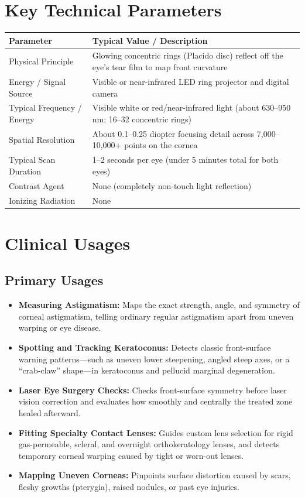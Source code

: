 \section{Key Technical Parameters}
\noindent
\begin{tabularx}{\textwidth}{@{}l X@{}}
\toprule
\textbf{Parameter} & \textbf{Typical Value / Description} \\
\midrule
Physical Principle & Glowing concentric rings (Placido disc) reflect off the eye's tear film to map front curvature \\
Energy / Signal Source & Visible or near-infrared LED ring projector and digital camera \\
Typical Frequency / Energy & Visible white or red/near-infrared light (about 630--950 nm; 16--32 concentric rings) \\
Spatial Resolution & About 0.1--0.25 diopter focusing detail across 7,000--10,000+ points on the cornea \\
Typical Scan Duration & 1--2 seconds per eye (under 5 minutes total for both eyes) \\
Contrast Agent & None (completely non-touch light reflection) \\
Ionizing Radiation & None \\
\bottomrule
\end{tabularx}

\section{Clinical Usages}

\subsection{Primary Usages}
\begin{itemize}
    \item \textbf{Measuring Astigmatism:} Maps the exact strength, angle, and symmetry of corneal astigmatism, telling ordinary regular astigmatism apart from uneven warping or eye disease.
    \item \textbf{Spotting and Tracking Keratoconus:} Detects classic front-surface warning patterns---such as uneven lower steepening, angled steep axes, or a ``crab-claw'' shape---in keratoconus and pellucid marginal degeneration.
    \item \textbf{Laser Eye Surgery Checks:} Checks front-surface symmetry before laser vision correction and evaluates how smoothly and centrally the treated zone healed afterward.
    \item \textbf{Fitting Specialty Contact Lenses:} Guides custom lens selection for rigid gas-permeable, scleral, and overnight orthokeratology lenses, and detects temporary corneal warping caused by tight or worn-out lenses.
    \item \textbf{Mapping Uneven Corneas:} Pinpoints surface distortion caused by scars, fleshy growths (pterygia), raised nodules, or past eye injuries.
\end{itemize}

